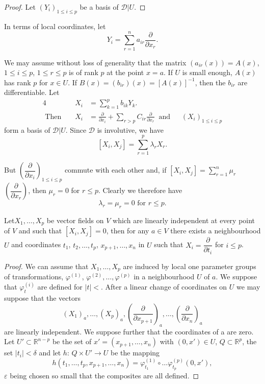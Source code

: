 \begin{proof}
  Let $(Y_i)_{1 \leq i \leq p}$ be a basis of $\mathscr{D}\big|U$.
\end{proof}

In terms of local coordinates, let
$$
Y_i = \sum^n_{r=1} a_{ir} \frac{\partial}{\partial x_r}.
$$

We may assume without loss of generality that the matrix $(a_{ir}(x))=
A(x)$, $1 \leq i \leq p$, $1 \leq r \leq p$ is of rank $p$ at the
point $x=a$. If $U$ is small enough, $A(x)$ has rank $p$ for $x \in
U$. If $B(x) = (b_{ir})(x) = [A(x)]^{-1}$, then the $b_{ir}$ are
differentiable. Let 
\begin{alignat*}{4}
  && X_i &= \sum^p_{k=1} b_{ik} Y_k. \\
  \text{ Then } && X_i & = \frac{\partial}{\partial x_i} + \sum_{r >
    p} C_{ir}\frac{\partial}{\partial x_r} ~\text{ and }~ \quad (X_i)_{1
    \leq i \leq p} 
\end{alignat*}
form a basis of $\mathscr{D}\big|U$. Since $\mathscr{D}$ is
involutive, we have 
$$
[X_i, X_j] = \sum^{p}_{r=1} \lambda_r X_r.
$$

But $\left(\dfrac{\partial}{\partial x_i}\right)_{1 \leq i \leq p}$ commute with
each other and, if $[X_i, X_j] = \sum \limits^n_{r=1} \mu_r$
 $\left(\dfrac{\partial}{\partial x_r}\right)$, then $\mu_r = 0$ for $r \leq
p$. Clearly we therefore have  
$$
\lambda_r = \mu_r = 0 \text{ for } r \leq p.
$$

\begin{proposition}\label{chap2:sec6:prop4}%
  Let\pageoriginale $X_1, \ldots, X_p$ be vector fields on $V$ which are linearly
  independent at every point of $V$ and such that $[X_i, X_j]=0$, then
  for any $a \in V$ there exists a neighbourhood $U$ and coordinates
  $t_1$, $t_2, \ldots, t_p$, $x_{p+1}, \ldots, x_n$ in $U$ such that
  $X_i = \dfrac{\partial}{\partial t_i}$ for $i \leq p$. 
\end{proposition}

\begin{proof}
  We can assume that $X_1, \ldots, X_p$ are induced by local one
  parameter groups of transformations, $\varphi^{(1)}$, $\varphi^{(2)},
  \ldots, \varphi^{(p)}$ in a neighbourhood $U$ of $a$. We suppose
  that $\varphi^{(i)}_t$ are defined for $| t | < $. After
  a linear change of coordinates on $U$ we may suppose that the
  vectors 
  $$
  (X_1)_a , \ldots, (X_p)_a, \left(\frac{\partial}{\partial x_{p+1}}\right)_a,
  \ldots, \left(\frac{\partial}{\partial x_n}\right)_a 
  $$
  are linearly independent. We suppose further that the coordinates of
  a are zero. Let $U' \subset \mathbb{R}^{n-p}$ be the set of $x' =
  (x_{p+1}, \ldots, x_n)$ with $(0, x') \in U$, $Q \subset
  \mathbb{R}^p$, the set $|t_i|< \delta$ and let $h$: $Q \times U' \to
  U$ be the mapping 
  $$
  h(t_1, \ldots, t_p, x_{p+1}, \ldots , x_n) = \varphi^{(1)}_{t_1} \circ
  \ldots \varphi^{(p)}_{t_p}(0, x'), 
  $$
  $ \varepsilon$ being chosen so small that the composites are all defined.
\end{proof}

